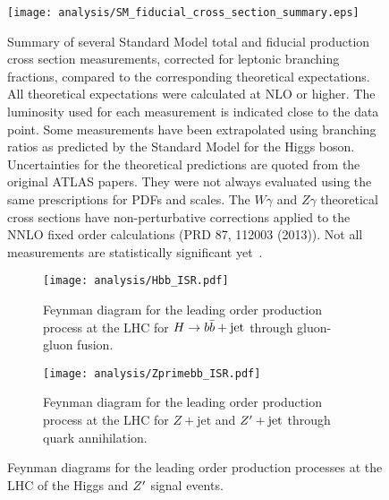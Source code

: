 \begin{figure}[htbp]
 \centering
 \texttt{[image: analysis/SM\_fiducial\_cross\_section\_summary.eps]}
 \caption[Summary of several Standard Model total and fiducial production cross section measurements.]{%
  Summary of several Standard Model total and fiducial production cross section measurements, corrected for leptonic branching fractions, compared to the corresponding theoretical expectations.
  All theoretical expectations were calculated at NLO or higher.
  The luminosity used for each measurement is indicated close to the data point.
  Some measurements have been extrapolated using branching ratios as predicted by the Standard Model for the Higgs boson.
  Uncertainties for the theoretical predictions are quoted from the original ATLAS papers.
  They were not always evaluated using the same prescriptions for PDFs and scales.
  The $W\gamma$ and $Z\gamma$ theoretical cross sections have non-perturbative corrections applied to the NNLO fixed order calculations (PRD 87, 112003 (2013)).
  Not all measurements are statistically significant yet~\cite{web:ATLAS_SM_summary_plots}.}
 \label{fig:SM_fiducial_cross_section_summary}
\end{figure}

\begin{figure}[htbp]
 \centering
 \begin{subfigure}[t]{0.48\textwidth}
  \centering
  \texttt{[image: analysis/Hbb\_ISR.pdf]}
  \caption[Feynman diagram for the leading order production process at the LHC for ${\Hbb + \textrm{jet}}$.]{%
   Feynman diagram for the leading order production process at the LHC for ${\Hbb + \textrm{jet}}$ through gluon-gluon fusion.}
  \label{fig:signal_LO_diagram_Higgs}
 \end{subfigure}%
 \quad
 \begin{subfigure}[t]{0.48\textwidth}
  \centering
  \texttt{[image: analysis/Zprimebb\_ISR.pdf]}
  \caption[Feynman diagram for the leading order production process at the LHC for ${\Zprime + \textrm{jet}}$.]{%
   Feynman diagram for the leading order production process at the LHC for ${Z + \textrm{jet}}$ and ${\Zprime + \textrm{jet}}$ through quark annihilation.}
  \label{fig:signal_LO_diagram_Zprime}
 \end{subfigure}
 \caption[Feynman diagrams for the leading order production processes at the LHC for the signal events.]{%
  Feynman diagrams for the leading order production processes at the LHC of the Higgs and $Z^{\prime}$ signal events.}
 \label{fig:signal_LO_diagrams}
\end{figure}

